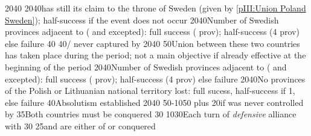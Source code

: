 %
%
{20}{40}{\EU@objNoRUSBaltique}%
%
%
{20}{40}{\POL has still its claim to the throne of Sweden (given by
  \ref{pIII:Union Poland Sweden}); half-success if the event does not occur}%
%
%
%
{20}{40}{Number of Swedish provinces adjacent to \regionBaltique (\regionSuede
  and \regionFinlande excepted): full success ( prov);
  half-success (4 prov) else failure}%
%
%
{}{40}{}%
%
%
{}{40}{\provinceOsterreich/ never captured by
  }%
%
%
{20}{40}{\EU@objNoRUSBaltique}%
%
%
%
{}{50}{Union between these two countries has taken place during the period;
  not a main objective if already effective at the beginning of the period}%
%
%
%
{20}{40}{Number of Swedish provinces adjacent to \regionBaltique (\regionSuede
  and \regionFinlande excepted): full success ( prov);
  half-success (4 prov) else failure}%
%
%
{20}{40}{No provinces of the Polish or Lithuanian national territory lost:
  full sucess, half-success if 1, else failure}%
%
%
{}{40}{Absolutism established}%
%
%
{20}{40}{\EU@objNoRUSBaltique}%
%
%
{50-10}{50}{ plus 20\VPs if \villeVienne was never
  controlled by \paysmajeurTurquie}%
%
 
%
%
{}{35}{Both countries must be conquered}%
%
%
{}{30}{}%
%
%
{10}{30}{Each turn of \emph{defensive} alliance with \paysmajeurFrance}%
%
%
{}{30}{}%
%
\EUobjective{}{\paysvalachie/\paysmoldavie}{}%
{}{25}{\paysvalachie and \paysmoldavie are either \VASSAL of \TUR or
  conquered}%
